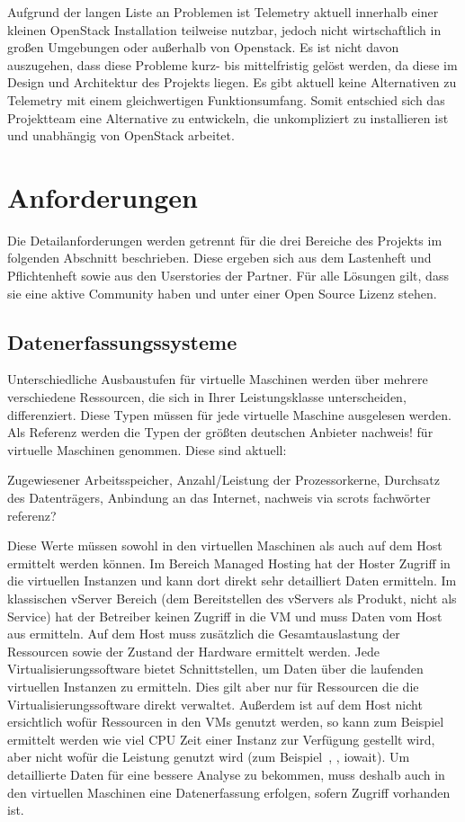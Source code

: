 Aufgrund der langen Liste an Problemen ist Telemetry aktuell innerhalb einer
kleinen OpenStack Installation teilweise nutzbar, jedoch nicht wirtschaftlich
in großen Umgebungen oder außerhalb von Openstack. Es ist nicht davon
auszugehen, dass diese Probleme kurz- bis mittelfristig gelöst werden, da diese
im Design und Architektur des Projekts liegen. Es gibt aktuell keine
Alternativen zu Telemetry mit einem gleichwertigen Funktionsumfang. Somit
entschied sich das Projektteam eine Alternative zu entwickeln, die
unkompliziert zu installieren ist und unabhängig von OpenStack arbeitet.
\tm%

\section{Anforderungen}
Die Detailanforderungen werden getrennt für die drei Bereiche des Projekts im
folgenden Abschnitt beschrieben. Diese ergeben sich aus dem Lastenheft und
Pflichtenheft sowie aus den Userstories der Partner. Für alle Lösungen gilt,
dass sie eine aktive Community haben und unter einer Open Source Lizenz stehen.
\tm%

\subsection{Datenerfassungssysteme}
\label{section:datenerfassungssysteme}
Unterschiedliche Ausbaustufen für virtuelle Maschinen werden über mehrere
verschiedene Ressourcen, die sich in Ihrer Leistungsklasse unterscheiden,
differenziert. Diese Typen müssen für jede virtuelle Maschine ausgelesen werden.
Als Referenz werden die Typen der größten deutschen Anbieter nachweis! für
virtuelle Maschinen genommen. Diese sind aktuell:

Zugewiesener Arbeitsspeicher, Anzahl/Leistung der Prozessorkerne, Durchsatz des
Datenträgers, Anbindung an das Internet, nachweis via scrots fachwörter
referenz?

Diese Werte müssen sowohl in den virtuellen Maschinen als auch auf dem Host
ermittelt werden können. Im Bereich Managed Hosting hat der Hoster Zugriff in
die virtuellen Instanzen und kann dort direkt sehr detailliert Daten ermitteln.
Im klassischen vServer Bereich (dem Bereitstellen des vServers als Produkt,
nicht als Service) hat der Betreiber keinen Zugriff in die VM und muss Daten
vom Host aus ermitteln. Auf dem Host muss zusätzlich die Gesamtauslastung der
Ressourcen sowie der Zustand der Hardware ermittelt werden.  Jede
Virtualisierungssoftware bietet Schnittstellen, um Daten über die laufenden
virtuellen Instanzen zu ermitteln. Dies gilt aber nur für Ressourcen die die
Virtualisierungssoftware direkt verwaltet. Außerdem ist auf dem Host nicht
ersichtlich wofür Ressourcen in den VMs genutzt werden, so kann zum Beispiel
ermittelt werden wie viel CPU Zeit einer Instanz zur Verfügung gestellt wird,
aber nicht wofür die Leistung genutzt wird (zum
Beispiel~, ,
\gls{iowait}). Um detaillierte Daten für eine bessere Analyse zu bekommen, muss
deshalb auch in den virtuellen Maschinen eine Datenerfassung erfolgen, sofern
Zugriff vorhanden ist.

